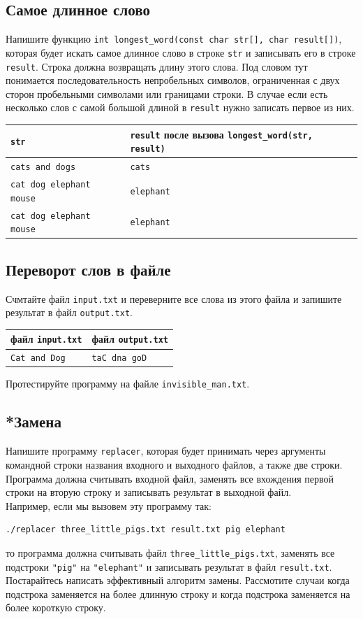 \documentclass{article}
\begin{document}
\subsection{Самое длинное слово}
Напишите функцию \texttt{int longest\_word(const char str[], char result[])}, которая будет искать самое длинное слово в строке \texttt{str} и записывать его в строке \texttt{result}. Строка должна возвращать длину этого слова. Под словом тут понимается последовательность непробельных символов, ограниченная с двух сторон пробельными символами или границами строки.
В случае если есть несколько слов с самой большой длиной в \texttt{result} нужно записать первое из них.

\begin{center}
\begin{tabular}{ l | l }
 \texttt{str} & \texttt{result} после вызова \texttt{longest\_word(str, result)} \\ \hline
 \texttt{cats and dogs} & \texttt{cats} \\
 \texttt{cat dog elephant mouse} & \texttt{elephant} \\
 \texttt{cat \quad dog \quad\quad elephant mouse} & \texttt{elephant} \\
\end{tabular}
\end{center}

\subsection{Переворот слов в файле}
Счмтайте файл \texttt{input.txt}  и переверните все слова из этого файла и запишите результат в файл \texttt{output.txt}.
\begin{center} 
\begin{tabular}{ l | l }
 файл \texttt{input.txt} & файл \texttt{output.txt} \\ \hline
 \texttt{Cat and Dog} & \texttt{taC dna goD}\\
\end{tabular}
\end{center}
Протестируйте программу на файле \texttt{invisible\_man.txt}.






\subsection{*Замена}
Напишите программу \texttt{replacer}, которая будет принимать через аргументы командной строки названия входного и выходного файлов, а также две строки. Программа должна считывать входной файл, заменять все вхождения первой строки на вторую строку и записывать результат в выходной файл.\\
Например, если мы вызовем эту программу так:
\begin{verbatim}
./replacer three_little_pigs.txt result.txt pig elephant
\end{verbatim}
то программа должна считывать файл \texttt{three\_little\_pigs.txt}, заменять все подстроки \texttt{"pig"} на \texttt{"elephant"} и записывать результат в файл \texttt{result.txt}. Постарайтесь написать эффективный алгоритм замены. Рассмотите случаи когда подстрока заменяется на более длинную строку и когда подстрока заменяется на более короткую строку.
\end{document}
